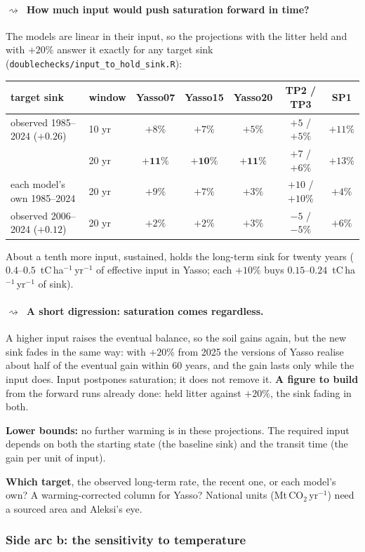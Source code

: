 \documentclass[11pt]{article}
\newcommand{\dparagraph}[1]{\paragraph{\textcolor{noterule}{$\rightsquigarrow$}\ #1}}
\begin{document}
\dparagraph{How much input would push saturation forward in time?} The models are linear in their input, so
the projections with the litter held and with $+20\%$ answer it exactly for any target sink
(\texttt{doublechecks/input\_to\_hold\_sink.R}):
\begin{center}\small
\begin{tabular}{llccccc}
\hline
target sink & window & Yasso07 & Yasso15 & Yasso20 & TP2 / TP3 & SP1 \\
\hline
observed 1985--2024 ($+0.26$) & 10 yr & $+8\%$ & $+7\%$ & $+5\%$ & $+5$ / $+5\%$ & $+11\%$ \\
 & 20 yr & $\mathbf{+11\%}$ & $\mathbf{+10\%}$ & $\mathbf{+11\%}$ & $+7$ / $+6\%$ & $+13\%$ \\
each model's own 1985--2024 & 20 yr & $+9\%$ & $+7\%$ & $+3\%$ & $+10$ / $+10\%$ & $+4\%$ \\
observed 2006--2024 ($+0.12$) & 20 yr & $+2\%$ & $+2\%$ & $+3\%$ & $-5$ / $-5\%$ & $+6\%$ \\
\hline
\end{tabular}
\end{center}
About a tenth more input, sustained, holds the long-term sink for twenty years ($0.4$--$0.5$~tC\,ha$^{-1}$\,yr$^{-1}$
of effective input in Yasso; each $+10\%$ buys $0.15$--$0.24$~tC\,ha$^{-1}$\,yr$^{-1}$ of sink).

\dparagraph{A short digression: saturation comes regardless.} A higher input raises the eventual balance, so the
soil gains again, but the new sink fades in the same way: with $+20\%$ from 2025 the versions of Yasso realise
about half of the eventual gain within 60 years, and the gain lasts only while the input does. Input postpones
saturation; it does not remove it. \textbf{A figure to build} from the forward runs already done: held litter
against $+20\%$, the sink fading in both.
\begin{warn}
\textbf{Lower bounds:} no further warming is in these projections. The required input depends on both the
starting state (the baseline sink) and the transit time (the gain per unit of input).
\end{warn}
\begin{test}
\textbf{Which target}, the observed long-term rate, the recent one, or each model's own? A warming-corrected
column for Yasso? National units (Mt\,CO$_2$\,yr$^{-1}$) need a sourced area and Aleksi's eye.
\end{test}

\subsubsection{Side arc b: the sensitivity to temperature}
\end{document}

